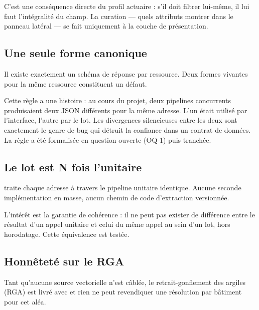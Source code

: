 C'est une conséquence directe du profil actuaire : s'il doit filtrer lui-même,
il lui faut l'intégralité du champ. La curation — quels attributs montrer dans
le panneau latéral — se fait uniquement à la couche de présentation.

\subsection{Une seule forme canonique}

\begin{invariant}
Il existe exactement un schéma de réponse par ressource. Deux formes vivantes
pour la même ressource constituent un défaut.
\end{invariant}

Cette règle a une histoire : au cours du projet, deux pipelines concurrents
produisaient deux JSON différents pour la même adresse. L'un était utilisé par
l'interface, l'autre par le lot. Les divergences silencieuses entre les deux
sont exactement le genre de bug qui détruit la confiance dans un contrat de
données. La règle a été formalisée en question ouverte (OQ-1) puis tranchée.

\subsection{Le lot est N fois l'unitaire}

\begin{invariant}
 traite chaque adresse à travers le pipeline
unitaire identique. Aucune seconde implémentation en masse, aucun chemin de
code d'extraction versionnée.
\end{invariant}

L'intérêt est la garantie de cohérence : il ne peut pas exister de différence
entre le résultat d'un appel unitaire et celui du même appel au sein d'un lot,
hors horodatage. Cette équivalence est testée.

\subsection{Honnêteté sur le RGA}

\begin{invariant}
Tant qu'aucune source vectorielle n'est câblée, le retrait-gonflement des
argiles (RGA) est livré avec  et
rien ne peut revendiquer une résolution par bâtiment pour cet aléa.
\end{invariant}


